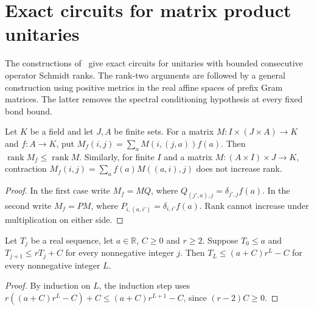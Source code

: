 \section{Exact circuits for matrix product unitaries}

The constructions of~\cite{RankTwoMPUCircuits2026} give exact circuits
for unitaries with bounded consecutive operator Schmidt ranks. The
rank-two arguments are followed by a general construction using positive
metrics in the real affine spaces of prefix Gram matrices. The latter
removes the spectral conditioning hypothesis at every fixed bond bound.

\begin{lemma}
    \label{thm:mpu_schmidt_span_contraction}
    \leanok
    Let $K$ be a field and let $J,A$ be finite sets. For a matrix
    $M:I\times(J\times A)\to K$ and $f:A\to K$, put
    $M_f(i,j)=\sum_a M(i,(j,a))f(a)$. Then
    $\operatorname{rank}M_f\leq\operatorname{rank}M$.
    Similarly, for finite $I$ and a matrix
    $M:(A\times I)\times J\to K$, contraction
    $M_f(i,j)=\sum_a f(a)M((a,i),j)$ does not increase rank.
\end{lemma}
\begin{proof}\leanok
    In the first case write $M_f=MQ$, where
    $Q_{(j',a),j}=\delta_{j',j}f(a)$.
    In the second write $M_f=PM$, where
    $P_{i,(a,i')}=\delta_{i,i'}f(a)$.
    Rank cannot increase under multiplication on either side.
\end{proof}

\begin{lemma}
    \label{thm:mpu_constant_branching_cost}
    \leanok
    Let $T_j$ be a real sequence, let $a\in\mathbb R$, $C\geq0$ and
    $r\geq2$. Suppose $T_0\leq a$ and $T_{j+1}\leq rT_j+C$ for
    every nonnegative integer $j$. Then
    $T_L\leq(a+C)r^L-C$ for every nonnegative integer $L$.
\end{lemma}
\begin{proof}\leanok
    By induction on $L$, the induction step uses
    $r((a+C)r^L-C)+C\leq(a+C)r^{L+1}-C$, since $(r-2)C\geq0$.
\end{proof}

